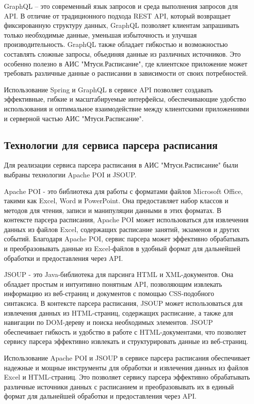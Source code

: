 GraphQL -- это современный язык запросов и среда выполнения запросов для API.
В отличие от традиционного подхода REST API, который возвращает фиксированную структуру данных,
GraphQL позволяет клиентам запрашивать только необходимые данные,
уменьшая избыточность и улучшая производительность.
GraphQL также обладает гибкостью и возможностью составлять сложные запросы, объединяя данные из различных источников.
Это особенно полезно в АИС "Мтуси.Расписание", где клиентское приложение может требовать
различные данные о расписании в зависимости от своих потребностей.

Использование Spring и GraphQL в сервисе API позволяет создавать эффективные,
гибкие и масштабируемые интерфейсы, обеспечивающие удобство использования и
оптимальное взаимодействие между клиентскими приложениями и серверной частью АИС "Мтуси.Расписание".

\subsection{Технологии для сервиса парсера расписания}
Для реализации сервиса парсера расписания в АИС "Мтуси.Расписание" были выбраны технологии Apache POI и JSOUP.

Apache POI - это библиотека для работы с форматами файлов Microsoft Office,
такими как Excel, Word и PowerPoint. Она предоставляет набор классов и методов для чтения,
записи и манипуляции данными в этих форматах. В контексте парсера расписания,
Apache POI может использоваться для извлечения данных из файлов Excel,
содержащих расписание занятий, экзаменов и других событий.
Благодаря Apache POI, сервис парсера может эффективно обрабатывать и преобразовывать
данные из Excel-файлов в удобный формат для дальнейшей обработки и предоставления через API.

JSOUP - это Java-библиотека для парсинга HTML и XML-документов.
Она обладает простым и интуитивно понятным API, позволяющим извлекать информацию из веб-страниц и документов
с помощью CSS-подобного синтаксиса. В контексте парсера расписания, JSOUP может использоваться для извлечения данных из HTML-страниц,
содержащих расписание, а также для навигации по DOM-дереву и поиска необходимых элементов.
JSOUP обеспечивает гибкость и удобство в работе с HTML-документами, что
позволяет сервису парсера эффективно извлекать и структурировать данные из веб-страниц.

Использование Apache POI и JSOUP в сервисе парсера расписания обеспечивает
надежные и мощные инструменты для обработки и извлечения данных из файлов Excel и HTML-страниц.
Это позволяет сервису парсера эффективно обрабатывать различные источники данных с расписанием и преобразовывать их
в единый формат для дальнейшей обработки и предоставления через API.

